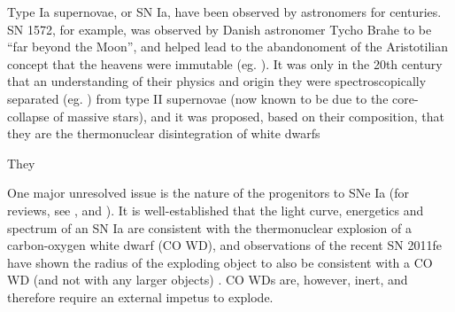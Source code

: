 
Type Ia supernovae, or SN Ia, have been observed by astronomers for centuries.  SN 1572, for example, was observed by Danish astronomer Tycho Brahe to be ``far beyond the Moon'', and helped lead to the abandonoment of the Aristotilian concept that the heavens were immutable (eg. \citealt{ruiz04, krau+08}).  It was only in the 20th century that an understanding of their physics and origin  they were spectroscopically separated (eg. \citealt{}) from type II supernovae (now known to be due to the core-collapse of massive stars), and it was proposed, based on their composition, that they are the thermonuclear disintegration of white dwarfs \citep{hoylf60, woos99}

They

One major unresolved issue is the nature of the progenitors to SNe Ia (for reviews, see \cite{hilln00}, \cite{howe11} and \cite{vker12}).  It is well-established that the light curve, energetics and spectrum of an SN Ia are consistent with the thermonuclear explosion of a carbon-oxygen white dwarf (CO WD), and observations of the recent SN 2011fe have shown the radius of the exploding object to also be consistent with a CO WD (and not with any larger objects) \citep{bloo+12}.  CO WDs are, however, inert, and therefore require an external impetus to explode.

